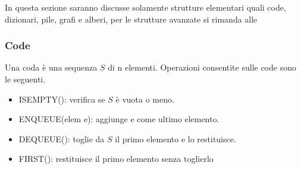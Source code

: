 \documentclass{subfiles}
\begin{document}
\begin{Note*}
    In questa sezione saranno discusse solamente strutture elementari quali code, dizionari, pile, grafi e alberi, per le strutture avanzate si rimanda alle %
\end{Note*}

\subsubsection{Code}
Una coda è una sequenza \(S\) di n elementi.
Operazioni consentite sulle code sono le seguenti.
\begin{itemize}
    \item ISEMPTY(): verifica se \(S\) è vuota o meno.
    \item ENQUEUE(elem e): aggiunge e come ultimo elemento.
    \item DEQUEUE(): toglie da \(S\) il primo elemento e lo restituisce.
    \item FIRST(): restituisce il primo elemento senza toglierlo
\end{itemize}
\end{document}
